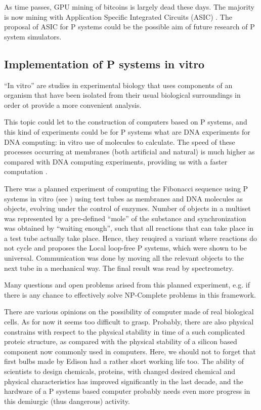 As time passes, GPU mining of bitcoins is largely dead these days. The majority is now mining with Application Specific Integrated Circuits (ASIC) \cite{Smith08ASIC}. The proposal of ASIC for P systems could be the possible aim of future research of P system simulators. 


\subsection{Implementation of P systems in vitro} %
\label{sub:implementation_of_p_systems_in_vitro}

``In vitro'' are studies in experimental biology that uses components of an organism that have been isolated from their usual biological surroundings in order ot provide a more convenient analysis.

This topic could let to the construction of computers based on P systems, and this kind of experiments could be for P systems what are DNA experiments for DNA computing: in vitro use of molecules to calculate. The speed of these processes occurring at membranes (both artificial and natural) is much higher as compared with DNA computing experiments, providing us with a faster computation \cite{Ardelean06InVitro}.

There was a planned experiment of computing the Fibonacci sequence using P systems in vitro (see \cite{Gershoni:2008:InVitro}) using test tubes as membranes and DNA molecules as objects, evolving under the control of enzymes. Number of objects in a multiset was represented by a pre-defined ``mole'' of the substance and synchronization was obtained by ``waiting enough'', such that all reactions that can take place in a test tube actually take place. Hence, they reuqired a variant where reactions do not cycle and proposes the Local loop-free P systems, which were shown to be universal. Communication was done by moving all the relevant objects to the next tube in a mechanical way. The final result was read by spectrometry.

Many questions and open problems arised from this planned experiment, e.g. if there is any chance to effectively solve NP-Complete problems in this framework. 

There are various opinions on the possibility of computer made of real biological cells. As for now it seems too difficult to grasp. Probably, there are also physical constrains with respect to the physical stability in time of a such complicated proteic structure, as compared with the physical stability of a silicon based component now commonly used in computers. Here, we should not to forget that first bulbs made by Edison had a rather short working life too. The ability of scientists to design chemicals, proteins, with changed desired chemical and physical characteristics has improved significantly in the last decade, and the hardware of a P systems based computer probably needs even more progress in this demiurgic (thus dangerous) activity.

